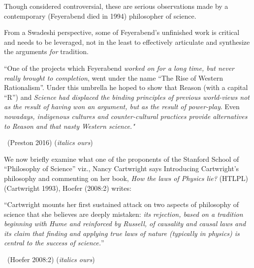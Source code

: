 \vskip 2pt

Though considered controversial, these are serious observations made by a contemporary (Feyerabend died in 1994) philosopher of science.

\vskip 2pt

From a Swadeshi perspective, some of Feyerabend’s unfinished work is critical and needs to be leveraged, not in the least to effectively articulate and synthesize the arguments \textit{for} tradition.

\vskip 2pt

\begin{myquote}
“One of the projects which Feyerabend \textit{worked on for a long time, but never really brought to completion}, went under the name “The Rise of Western Rationalism”. Under this umbrella he hoped to show that Reason (with a capital “R”) and \textit{Science had displaced the binding principles of previous world-views not as the result of having won an argument, but as the result of power-play}. Even \textit{nowadays, indigenous cultures and counter-cultural practices provide alternatives to Reason and that nasty Western science."} 

~\hfill (Preston 2016) (\textit{italics ours})
\end{myquote}

\vskip 2pt

We now briefly examine what one of the proponents of the Stanford School of “Philosophy of Science” viz., Nancy Cartwright says Introducing Cartwright’s philosophy and commenting on her book, \textit{How the laws of Physics lie?} (HTLPL) (Cartwright 1993), Hoefer (2008:2) writes:

\vskip 2pt

\begin{myquote}
“Cartwright mounts her first sustained attack on two aspects of philosophy of science that she believes are deeply mistaken: \textit{its rejection, based on a tradition beginning with Hume and reinforced by Russell, of causality and causal laws and its claim that finding and applying true laws of nature (typically in physics) is central to the success of science.}” 

~\hfill (Hoefer 2008:2) (\textit{italics ours})
\end{myquote}

\vskip 2pt

